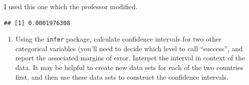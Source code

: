 \documentclass[
]{article}
\newenvironment{Shaded}{\begin{snugshade}}{\end{snugshade}}
\newcommand{\AttributeTok}[1]{\textcolor[rgb]{0.77,0.63,0.00}{#1}}
\newcommand{\ConstantTok}[1]{\textcolor[rgb]{0.00,0.00,0.00}{#1}}
\newcommand{\DecValTok}[1]{\textcolor[rgb]{0.00,0.00,0.81}{#1}}
\newcommand{\FloatTok}[1]{\textcolor[rgb]{0.00,0.00,0.81}{#1}}
\newcommand{\FunctionTok}[1]{\textcolor[rgb]{0.00,0.00,0.00}{#1}}
\newcommand{\NormalTok}[1]{#1}
\newcommand{\OtherTok}[1]{\textcolor[rgb]{0.56,0.35,0.01}{#1}}
\newcommand{\SpecialCharTok}[1]{\textcolor[rgb]{0.00,0.00,0.00}{#1}}
\newcommand{\StringTok}[1]{\textcolor[rgb]{0.31,0.60,0.02}{#1}}
\providecommand{\tightlist}{%
  \setlength{\itemsep}{0pt}\setlength{\parskip}{0pt}}
\begin{document}
\begin{Shaded}
\end{Shaded}

I used this one which the professor modified.

\begin{Shaded}
\end{Shaded}

\begin{verbatim}
## [1] 0.0001976308
\end{verbatim}

\begin{enumerate}
\def\labelenumi{\arabic{enumi}.}
\setcounter{enumi}{3}
\tightlist
\item
  Using the \texttt{infer} package, calculate confidence intervals for
  two other categorical variables (you'll need to decide which level to
  call ``success'', and report the associated margins of error. Interpet
  the interval in context of the data. It may be helpful to create new
  data sets for each of the two countries first, and then use these data
  sets to construct the confidence intervals.
\end{enumerate}
\end{document}
